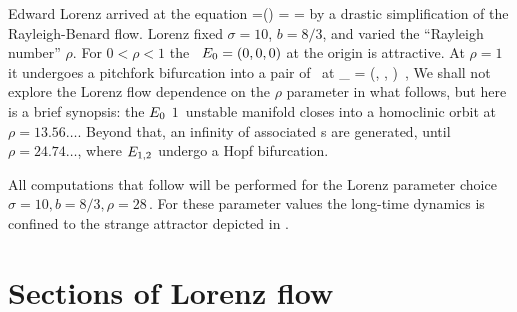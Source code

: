 Edward Lorenz arrived at the equation
\beq
\dot{\ssp}=\pVeloc(\ssp)
    =
    =
by a drastic simplification of
the Rayleigh-Benard flow. %
Lorenz fixed
$\sigma = 10$, $ b= 8/3$,
and varied the ``Rayleigh number'' $\rho$. For
$0 < \rho < 1$ the \eqv\ $E_{0} =(0,0,0)$
at the origin is attractive.
At $ \rho = 1$  it undergoes a pitchfork
bifurcation into a pair of \eqva\ at
\beq
\ssp_{} = (\pm {}, \pm {}, )
\,,
We shall not explore the Lorenz flow dependence on the $\rho$
parameter in what follows, but here is a brief synopsis: the
$E_{0}$  $1$\dmn\ unstable manifold closes into a
homoclinic orbit at $\rho=13.56\dots$. Beyond that, an infinity
of associated \po s are generated, until $\rho = 24.74\dots$,
where $E_{1,2}$ undergo a Hopf bifurcation.

All computations that follow
will be performed for the Lorenz parameter choice
\(
    \sigma = 10, b= 8/3, \rho = 28
\,.
\)
For these parameter values the long-time dynamics is confined to
the strange attractor
depicted in  .

\section{Sections of Lorenz flow}\label{exmp:LorenzSect}


